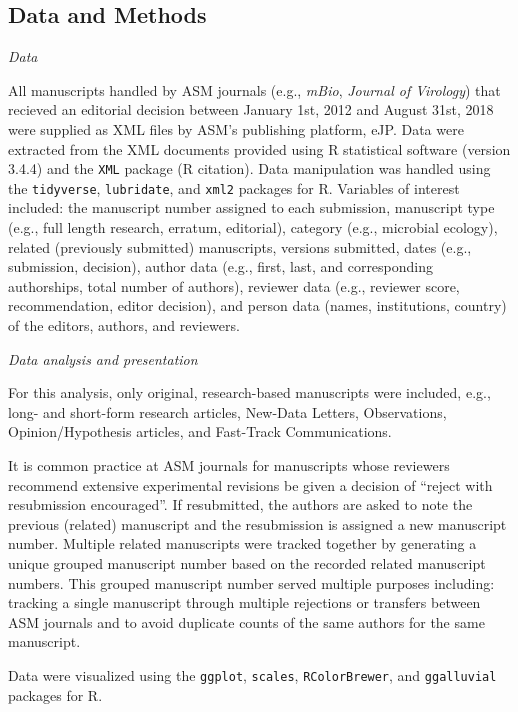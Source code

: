 \documentclass[11pt,]{article}
\begin{document}
\subsection{Data and Methods}\label{data-and-methods}

\emph{Data}

All manuscripts handled by ASM journals (e.g., \emph{mBio},
\emph{Journal of Virology}) that recieved an editorial decision between
January 1st, 2012 and August 31st, 2018 were supplied as XML files by
ASM's publishing platform, eJP. Data were extracted from the XML
documents provided using R statistical software (version 3.4.4) and the
\texttt{XML} package (R citation). Data manipulation was handled using
the \texttt{tidyverse}, \texttt{lubridate}, and \texttt{xml2} packages
for R. Variables of interest included: the manuscript number assigned to
each submission, manuscript type (e.g., full length research, erratum,
editorial), category (e.g., microbial ecology), related (previously
submitted) manuscripts, versions submitted, dates (e.g., submission,
decision), author data (e.g., first, last, and corresponding
authorships, total number of authors), reviewer data (e.g., reviewer
score, recommendation, editor decision), and person data (names,
institutions, country) of the editors, authors, and reviewers.

\emph{Data analysis and presentation}

For this analysis, only original, research-based manuscripts were
included, e.g., long- and short-form research articles, New-Data
Letters, Observations, Opinion/Hypothesis articles, and Fast-Track
Communications.

It is common practice at ASM journals for manuscripts whose reviewers
recommend extensive experimental revisions be given a decision of
``reject with resubmission encouraged''. If resubmitted, the authors are
asked to note the previous (related) manuscript and the resubmission is
assigned a new manuscript number. Multiple related manuscripts were
tracked together by generating a unique grouped manuscript number based
on the recorded related manuscript numbers. This grouped manuscript
number served multiple purposes including: tracking a single manuscript
through multiple rejections or transfers between ASM journals and to
avoid duplicate counts of the same authors for the same manuscript.

Data were visualized using the \texttt{ggplot}, \texttt{scales},
\texttt{RColorBrewer}, and \texttt{ggalluvial} packages for R.
\end{document}
